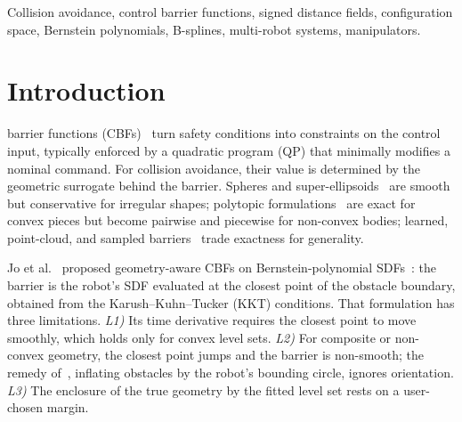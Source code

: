\documentclass[journal]{IEEEtran}
\theoremstyle{definition}
\begin{document}
\begin{IEEEkeywords}
Collision avoidance, control barrier functions, signed distance fields, configuration space,
Bernstein polynomials, B-splines, multi-robot systems, manipulators.
\end{IEEEkeywords}

\section{Introduction}\label{sec:intro}

 barrier functions (CBFs)~\cite{ames2019cbf} turn safety conditions into
constraints on the control input, typically enforced by a quadratic program (QP) that minimally
modifies a nominal command. For collision avoidance, their value is determined by the geometric
surrogate behind the barrier. Spheres and super-ellipsoids~\cite{wang2017safety,wang2017quadrotors}
are smooth but conservative for irregular shapes; polytopic
formulations~\cite{chen2025minkowski,thirugnanam2025strongly} are exact for convex pieces but become
pairwise and piecewise for non-convex bodies; learned, point-cloud, and sampled
barriers~\cite{khan2022gaussian,long2021learning,dai2024sailing,lutkus2025sampling} trade exactness
for generality.

Jo et al.~\cite{jo2026geometry} proposed geometry-aware CBFs on Bernstein-polynomial
SDFs~\cite{li2024representing}: the barrier is the robot's SDF evaluated at the closest point of the
obstacle boundary, obtained from the Karush--Kuhn--Tucker (KKT) conditions. That formulation has
three limitations. \emph{L1)} Its time derivative requires the closest point to move smoothly, which
holds only for convex level sets. \emph{L2)} For composite or non-convex geometry, the closest point
jumps and the barrier is non-smooth; the remedy of~\cite{jo2026geometry}, inflating obstacles by
the robot's bounding circle, ignores orientation. \emph{L3)} The enclosure of the true geometry by
the fitted level set rests on a user-chosen margin.
\end{document}
